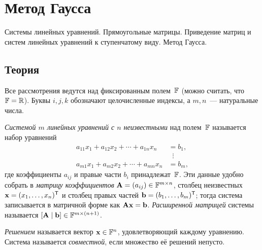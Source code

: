 
\section{Метод Гаусса}
\label{sec:1.1.01-systems-gauss}

\begin{ticket}
Системы линейных уравнений. Прямоугольные матрицы. Приведение матриц и систем линейных уравнений к ступенчатому виду. Метод Гаусса.
\end{ticket}

\subsection*{Теория}

Все рассмотрения ведутся над фиксированным полем~$\mathbb{F}$ (можно считать,
что $\mathbb{F} = \mathbb{R}$). Буквы $i, j, k$ обозначают целочисленные индексы,
а $m, n$~--- натуральные числа.

\begin{definition}
\label{def:gauss-system}
\emph{Системой $m$ линейных уравнений с $n$ неизвестными} над полем~$\mathbb{F}$
называется набор уравнений
\[
  \begin{aligned}
    a_{11} x_1 + a_{12} x_2 + \cdots + a_{1n} x_n &= b_1, \\
    &\;\;\vdots \\
    a_{m1} x_1 + a_{m2} x_2 + \cdots + a_{mn} x_n &= b_m,
  \end{aligned}
\]
где коэффициенты $a_{ij}$ и правые части $b_i$ принадлежат~$\mathbb{F}$. Эти
данные удобно собрать в \emph{матрицу коэффициентов}
$\mathbf{A} = (a_{ij}) \in \mathbb{F}^{m \times n}$, столбец неизвестных
$\mathbf{x} = (x_1, \dots, x_n)^{\mathsf{T}}$ и столбец правых частей
$\mathbf{b} = (b_1, \dots, b_m)^{\mathsf{T}}$; тогда система записывается в матричной
форме как $\mathbf{A}\mathbf{x} = \mathbf{b}$. \emph{Расширенной матрицей}
системы называется $[\mathbf{A} \mid \mathbf{b}] \in \mathbb{F}^{m \times (n+1)}$.

\emph{Решением} называется вектор $\mathbf{x} \in \mathbb{F}^n$, удовлетворяющий
каждому уравнению. Система называется \emph{совместной}, если
множество её решений непусто.
\end{definition}

